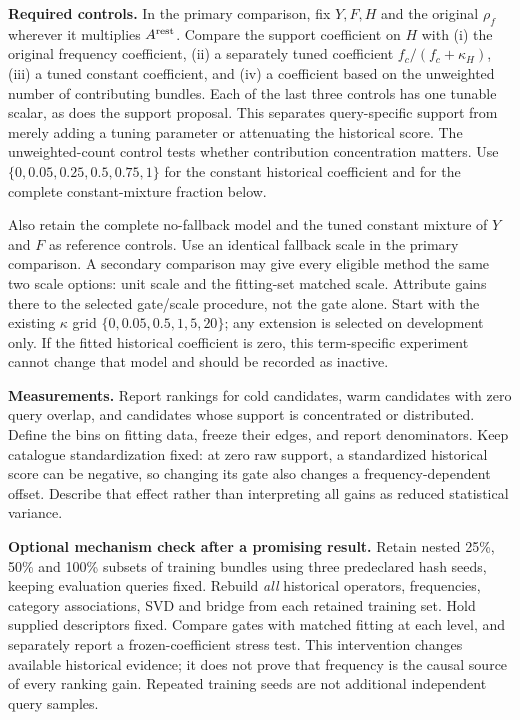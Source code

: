 \documentclass[11pt,a4paper]{article}
\begin{document}
\textbf{Required controls.} In the primary comparison, fix $Y,F,H$ and
the original $\rho_f$ wherever it multiplies $A^{\rm rest}$. Compare the
support coefficient on $H$ with (i) the original frequency coefficient,
(ii) a separately tuned coefficient $f_c/(f_c+\kappa_H)$, (iii) a tuned
constant coefficient, and (iv) a coefficient based on the unweighted number
of contributing bundles. Each of the last three controls has one tunable
scalar, as does the support proposal. This separates query-specific support
from merely adding a tuning parameter or attenuating the historical score.
The unweighted-count control tests whether contribution concentration matters.
Use $\{0,0.05,0.25,0.5,0.75,1\}$ for the constant historical coefficient
and for the complete constant-mixture fraction below.

Also retain the complete no-fallback model and the tuned constant mixture
of $Y$ and $F$ as reference controls. Use an identical fallback scale in
the primary comparison. A secondary comparison may give every eligible
method the same two scale options: unit scale and the fitting-set matched
scale. Attribute gains there to the selected gate/scale procedure, not the
gate alone. Start with the existing $\kappa$ grid
$\{0,0.05,0.5,1,5,20\}$; any extension is selected on development only.
If the fitted historical coefficient is zero, this term-specific experiment
cannot change that model and should be recorded as inactive.

\textbf{Measurements.} Report rankings for cold candidates, warm candidates
with zero query overlap, and candidates whose support is concentrated or
distributed. Define the bins on fitting data, freeze their edges, and report
denominators. Keep catalogue standardization fixed: at zero raw support,
a standardized historical score can be negative, so changing its gate also
changes a frequency-dependent offset. Describe that effect rather than
interpreting all gains as reduced statistical variance.

\textbf{Optional mechanism check after a promising result.} Retain nested
25\%, 50\% and 100\% subsets of training bundles using three predeclared
hash seeds, keeping evaluation queries fixed. Rebuild \emph{all} historical
operators, frequencies, category associations, SVD and bridge from each
retained training set. Hold supplied descriptors fixed. Compare gates with
matched fitting at each level, and separately report a frozen-coefficient
stress test. This intervention changes available historical evidence; it
does not prove that frequency is the causal source of every ranking gain.
Repeated training seeds are not additional independent query samples.
\end{document}
